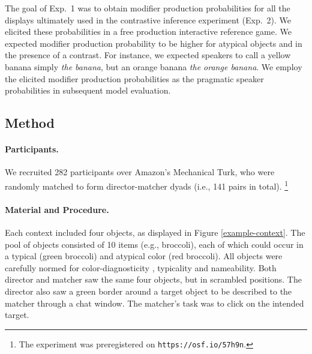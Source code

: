 \documentclass[10pt,letterpaper]{article}
\newcommand{\figref}[1]{Figure \ref{#1}}
\begin{document}
The goal of Exp.~1 was to obtain modifier production probabilities for all the displays ultimately used in the contrastive inference experiment (Exp.~2). We elicited these probabilities in a free production interactive reference game. We expected modifier production probability to be higher for atypical objects and in the presence of a contrast. For instance, we expected speakers to call a yellow banana simply \textit{the banana}, but an orange banana \textit{the orange banana}. We employ the elicited modifier production probabilities as the pragmatic speaker probabilities in subsequent model evaluation.

\subsection{Method}

\paragraph{Participants.} We recruited 282 participants over Amazon's Mechanical Turk, who were randomly matched to form director-matcher dyads (i.e., 141 pairs in total).%
\footnote{The experiment was preregistered on \texttt{https://osf.io/57h9n}.}%




\paragraph{Material and Procedure.} Each context included four objects, as displayed in \figref{example-context}. The pool of objects consisted of 10 items (e.g., broccoli), each of which could occur in a typical (green broccoli) and atypical color (red broccoli). All objects were carefully normed for color-diagnosticity \cite{Tanaka:1999}, typicality and nameability. Both director and matcher saw the same four objects, but in scrambled positions. The director also saw a green border around a target object to be described to the matcher through a chat window. The matcher's task was to click on the intended target.
\end{document}
